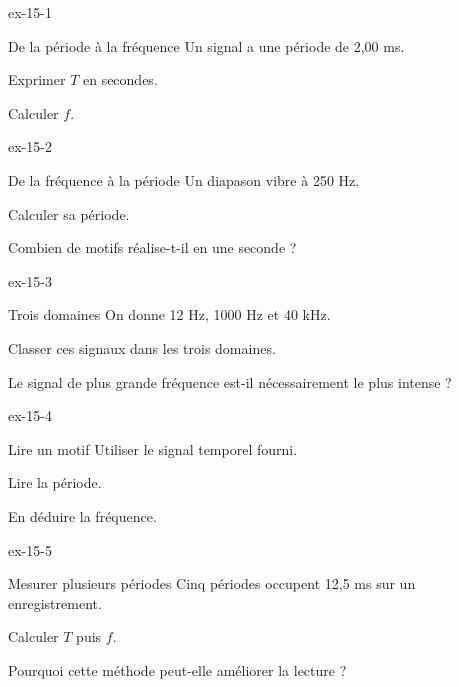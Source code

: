 \exercices
{}
\begin{blocLivre}{ex-15-1}\begin{exercice}[1]{De la période à la fréquence}
Un signal a une période de 2,00 ms.
\begin{questions}
\item Exprimer $T$ en secondes.
\item Calculer $f$.
\end{questions}
\end{exercice}\end{blocLivre}
\begin{blocLivre}{ex-15-2}\begin{exercice}[1]{De la fréquence à la période}
Un diapason vibre à 250 Hz.
\begin{questions}
\item Calculer sa période.
\item Combien de motifs réalise-t-il en une seconde ?
\end{questions}
\end{exercice}\end{blocLivre}
\begin{blocLivre}{ex-15-3}\begin{exercice}[1]{Trois domaines}
On donne 12 Hz, 1000 Hz et 40 kHz.
\begin{questions}
\item Classer ces signaux dans les trois domaines.
\item Le signal de plus grande fréquence est-il nécessairement le plus intense ?
\end{questions}
\end{exercice}\end{blocLivre}
\begin{blocLivre}{ex-15-4}\begin{exercice}[1]{Lire un motif}
Utiliser le signal temporel fourni.
\begin{questions}
\item Lire la période.
\item En déduire la fréquence.
\end{questions}
\end{exercice}\end{blocLivre}
\begin{blocLivre}{ex-15-5}\begin{exercice}[2]{Mesurer plusieurs périodes}
Cinq périodes occupent 12,5 ms sur un enregistrement.
\begin{questions}
\item Calculer $T$ puis $f$.
\item Pourquoi cette méthode peut-elle améliorer la lecture ?
\end{questions}
\end{exercice}\end{blocLivre}
